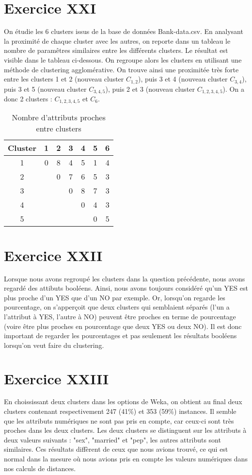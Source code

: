 \documentclass[a4paper, 11pt]{report}
\begin{document}
	\section{Exercice XXI}
	On étudie les 6 clusters issus de la base de données Bank-data.csv. En analysant la proximité de chaque cluster avec les autres, on reporte dans un tableau le nombre de paramêtres similaires entre les différents clusters. Le résultat est visible dans le tableau ci-dessous. On regroupe alors les clusters en utilisant une méthode de clustering agglomérative. On trouve ainsi une proximitée très forte entre les clusters 1 et 2 (nouveau cluster $C_{1,2}$), puis 3 et 4 (nouveau cluster $C_{3,4}$), puis 3 et 5 (nouveau cluster $C_{3,4,5}$), puis 2 et 3 (nouveau cluster $C_{1,2,3,4,5}$). On a donc 2 clusters : $C_{1,2,3,4,5}$ et $C_6$.
	
	\begin{table}[h!]
\centering
\begin{tabular}{| c | c | c | c | c | c | c |}
\hline
Cluster & 1 & 2 & 3 & 4 & 5 & 6 \\
\hline
1 & 0 & 8 & 4 & 5 & 1 & 4 \\
\hline
2 & & 0 & 7 & 6 & 5 & 3 \\
\hline
3 & & & 0 & 8 & 7 & 3 \\
\hline
4 & & & & 0 & 4 & 3 \\
\hline
5 & & & & & 0 & 5 \\
\hline

\end{tabular}
\caption{Nombre d'attributs proches entre clusters}
\label{tab:exo20}
\end{table}

	\section{Exercice XXII}
	Lorsque nous avons regroupé les clusters dans la question précédente, nous avons regardé des attibuts booléens. Ainsi, nous avons toujours considéré qu'un YES est plus proche d'un YES que d'un NO par exemple. Or, lorsqu'on regarde les pourcentage, on s'apperçoit que deux clusters qui semblaient séparés (l'un a l'attribut à YES, l'autre à NO) peuvent être proches en terme de pourcentage (voire être plus proches en pourcentage que deux YES ou deux NO). Il est donc important de regarder les pourcentages et pas seulement les résultats booléens lorsqu'on veut faire du clustering.

	\section{Exercice XXIII}
	En choississant deux clusters dans les options de Weka, on obtient au final deux clusters contenant respectivement 247 (41\%) et 353 (59\%) instances. Il semble que les attributs numériques ne sont pas pris en compte, car ceux-ci sont très proches dans les deux clusters. Les deux clusters se distinguent sur les attributs à deux valeurs suivants : "sex", "married" et "pep", les autres attributs sont similaires. Ces résultats diffèrent de ceux que nous avions trouvé, ce qui est normal dans la mesure où nous avions pris en compte les valeurs numériques dans nos calculs de distances.
\end{document}
